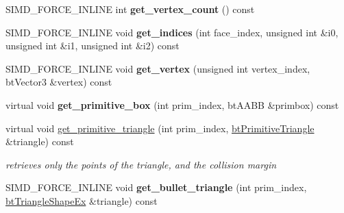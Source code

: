 \begin{DoxyCompactItemize}
\mbox{\label{classbtGImpactMeshShapePart_1_1TrimeshPrimitiveManager_a25388a6fc8303ae40c4442287c540b5e}} 
S\+I\+M\+D\+\_\+\+F\+O\+R\+C\+E\+\_\+\+I\+N\+L\+I\+NE int {\bfseries get\+\_\+vertex\+\_\+count} () const
\item 
\mbox{\label{classbtGImpactMeshShapePart_1_1TrimeshPrimitiveManager_a1ffd0ccbb9c1dc0254feb7f4c499351d}} 
S\+I\+M\+D\+\_\+\+F\+O\+R\+C\+E\+\_\+\+I\+N\+L\+I\+NE void {\bfseries get\+\_\+indices} (int face\+\_\+index, unsigned int \&i0, unsigned int \&i1, unsigned int \&i2) const
\item 
\mbox{\label{classbtGImpactMeshShapePart_1_1TrimeshPrimitiveManager_a89dde972e76dabc5dcf5832d878f7c5e}} 
S\+I\+M\+D\+\_\+\+F\+O\+R\+C\+E\+\_\+\+I\+N\+L\+I\+NE void {\bfseries get\+\_\+vertex} (unsigned int vertex\+\_\+index, bt\+Vector3 \&vertex) const
\item 
\mbox{\label{classbtGImpactMeshShapePart_1_1TrimeshPrimitiveManager_af577425b36503f969bea9582fc439f07}} 
virtual void {\bfseries get\+\_\+primitive\+\_\+box} (int prim\+\_\+index, bt\+A\+A\+BB \&primbox) const
\item 
\mbox{\label{classbtGImpactMeshShapePart_1_1TrimeshPrimitiveManager_a7932ca8b6bfb549b150859d116bab1ee}} 
virtual void \hyperlink{classbtGImpactMeshShapePart_1_1TrimeshPrimitiveManager_a7932ca8b6bfb549b150859d116bab1ee}{get\+\_\+primitive\+\_\+triangle} (int prim\+\_\+index, \hyperlink{classbtPrimitiveTriangle}{bt\+Primitive\+Triangle} \&triangle) const
\begin{DoxyCompactList}\small\item\em retrieves only the points of the triangle, and the collision margin \end{DoxyCompactList}\item 
\mbox{\label{classbtGImpactMeshShapePart_1_1TrimeshPrimitiveManager_a1eced6a7be515298bb6ccb320d10672f}} 
S\+I\+M\+D\+\_\+\+F\+O\+R\+C\+E\+\_\+\+I\+N\+L\+I\+NE void {\bfseries get\+\_\+bullet\+\_\+triangle} (int prim\+\_\+index, \hyperlink{classbtTriangleShapeEx}{bt\+Triangle\+Shape\+Ex} \&triangle) const

\end{DoxyCompactItemize}
